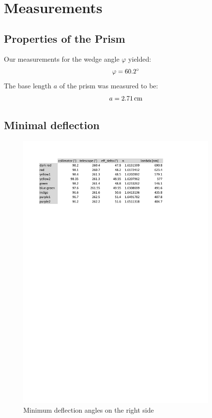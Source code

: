 \documentclass{scrreprt}
\newcommand{\unit}[1]{\ensuremath{\, \mathrm{#1}}}
\renewcommand{\phi}{\varphi}
\begin{document}
\section{Measurements}

\subsection{Properties of the Prism}
Our measurements for the wedge angle $\phi$ yielded:
\begin{equation}
\notag
	\phi = \ang{60.2}
\end{equation}
The base length $a$ of the prism was measured to be:
\begin{equation}
\notag
	a = 2.71 \unit{cm}
\end{equation}
 
\subsection{Minimal deflection}
\begin{figure}[H]
	\centering
  \includegraphics[width=0.9\textwidth]{diag/right.pdf}
	\caption{Minimum deflection angles on the right side}
	\label{fig:right}
\end{figure}
\end{document}
